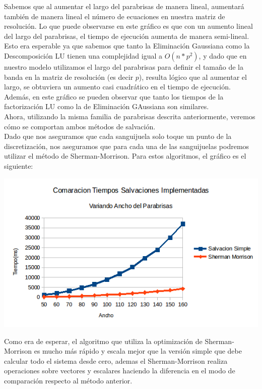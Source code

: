 Sabemos que al aumentar el largo del parabrisas de manera lineal, aumentará también de manera lineal el número de ecuaciones en nuestra matriz de resolución. Lo que puede observarse en este gráfico es que con un aumento lineal del largo del parabrisas, el tiempo de ejecución aumenta de manera semi-lineal. Esto era esperable ya que sabemos que tanto la Eliminación Gaussiana como la Descomposición LU tienen una complejidad igual a $O(n*p^2)$, y dado que en nuestro modelo utilizamos el largo del parabrisas para definir el tamaño de la banda en la matriz de resolución (es decir $p$), resulta lógico que al aumentar el largo, se obtuviera un aumento casi cuadrático en el tiempo de ejecución.
\\
Además, en este gráfico se pueden observar que tanto los tiempos de la factorización LU como la de Eliminación GAussiana son similares.
\\
Ahora, utilizando la misma familia de parabrisas descrita anteriormente, veremos cómo se comportan ambos métodos de salvación.
\\
Dado que nos aseguramos que cada sanguijuela solo toque un punto de la discretización, nos aseguramos que para cada una de las sanguijuelas podremos utilizar el método de Sherman-Morrison. Para estos algoritmos, el gráfico es el siguiente:
\\
\begin{center}
 \includegraphics[width=400pt]{imagenes/testeo/anchoSalv.png}
\end{center}

Como era de esperar, el algoritmo que utiliza la optimización de Sherman-Morrison es mucho más rápido y escala mejor que la versión simple que debe calcular todo el sistema desde cero, ademas el Sherman-Morrison realiza operaciones sobre vectores y escalares haciendo la diferencia en el modo de comparación respecto al método anterior.

